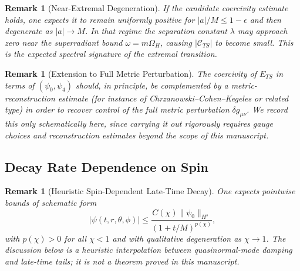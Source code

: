 \documentclass[12pt,a4paper]{article}
\newtheorem{remark}[theorem]{Remark}
\begin{document}
\begin{remark}[Near-Extremal Degeneration]
If the candidate coercivity estimate holds, one expects it to remain uniformly positive for $|a|/M \leq 1 - \epsilon$ and then degenerate as $|a| \to M$. In that regime the separation constant $\lambda$ may approach zero near the superradiant bound $\omega = m\Omega_H$, causing $|\mathcal{C}_{TS}|$ to become small. This is the expected spectral signature of the extremal transition.
\end{remark}

\begin{remark}[Extension to Full Metric Perturbation]
The coercivity of $E_{TS}$ in terms of $(\psi_0, \psi_4)$ should, in principle, be complemented by a metric-reconstruction estimate (for instance of Chrzanowski--Cohen--Kegeles or related type) in order to recover control of the full metric perturbation $\delta g_{\mu\nu}$. We record this only schematically here, since carrying it out rigorously requires gauge choices and reconstruction estimates beyond the scope of this manuscript.
\end{remark}

\subsection{Decay Rate Dependence on Spin}

\begin{remark}[Heuristic Spin-Dependent Late-Time Decay]\label{thm:decay-rate}
One expects pointwise bounds of schematic form
\begin{equation}\label{eq:decay-rate-main}
|\psi(t, r, \theta, \phi)| \leq \frac{C(\chi)\|\psi_0\|_{H^s}}{(1+t/M)^{p(\chi)}},
\end{equation}
with $p(\chi) > 0$ for all $\chi < 1$ and with qualitative degeneration as $\chi \to 1$. The discussion below is a heuristic interpolation between quasinormal-mode damping and late-time tails; it is not a theorem proved in this manuscript.
\end{remark}
\end{document}
